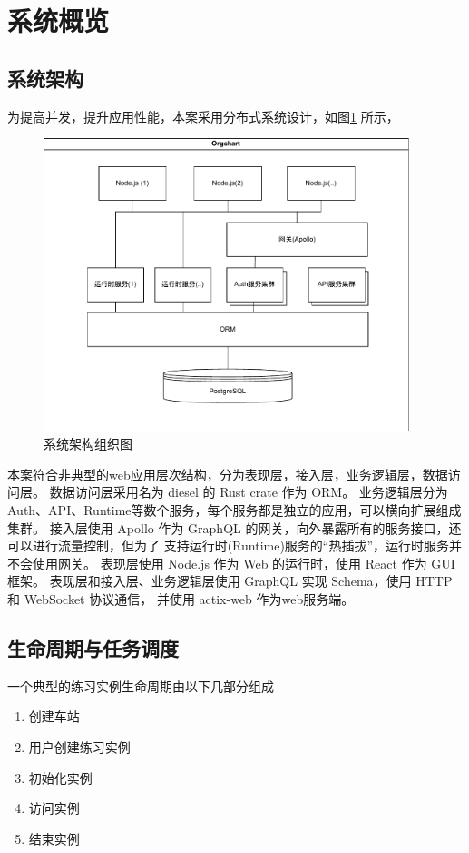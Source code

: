 \section{系统概览}
\subsection{系统架构}
为提高并发，提升应用性能，本案采用分布式系统设计，如图\ref{org} 所示，

\begin{figure}[htbp!]
    \centering
    \includegraphics[width=0.95\textwidth]{figures/pdf/org.pdf}
    \caption{\label{org}系统架构组织图}
\end{figure}

本案符合非典型的web应用层次结构，分为表现层，接入层，业务逻辑层，数据访问层。
数据访问层采用名为 diesel 的 Rust crate 作为 ORM。
业务逻辑层分为Auth、API、Runtime等数个服务，每个服务都是独立的应用，可以横向扩展组成集群。
接入层使用 Apollo 作为 GraphQL 的网关，向外暴露所有的服务接口，还可以进行流量控制，但为了
支持运行时(Runtime)服务的“热插拔”，运行时服务并不会使用网关。
表现层使用 Node.js 作为 Web 的运行时，使用 React 作为 GUI 框架。
表现层和接入层、业务逻辑层使用 GraphQL 实现 Schema，使用 HTTP 和 WebSocket 协议通信，
并使用 actix-web 作为web服务端。


\subsection{生命周期与任务调度}
一个典型的练习实例生命周期由以下几部分组成
\begin{enumerate}[\indent i.]
    \item 创建车站
    \item 用户创建练习实例
    \item 初始化实例
    \item 访问实例
    \item 结束实例
\end{enumerate}

